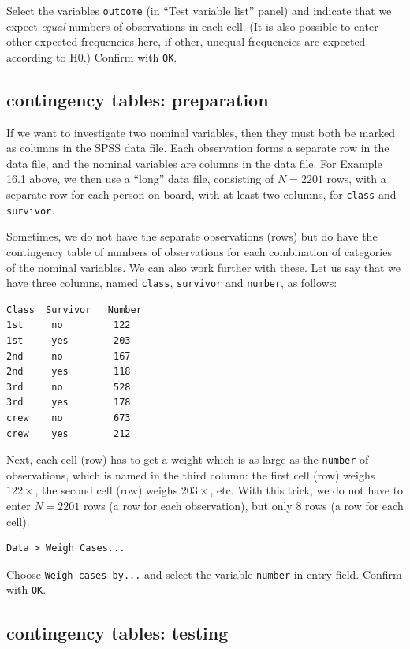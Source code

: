 \documentclass[
]{book}
\begin{document}
Select the variables \texttt{outcome} (in ``Test variable list'' panel) and
indicate that we expect \emph{equal} numbers of observations in each cell.
(It is also possible to enter other expected frequencies here,
if other, unequal frequencies are expected according to H0.)
Confirm with \texttt{OK}.

\subsection{contingency tables: preparation}\label{contingency-tables-preparation}

If we want to investigate two nominal variables, then they must
both be marked as columns in the SPSS data file. Each observation
forms a separate row in the data file, and the nominal variables
are columns in the data file. For Example 16.1 above, we then use a ``long''
data file, consisting of \(N=2201\) rows, with a separate row for each person
on board, with at least two columns, for \texttt{class} and
\texttt{survivor}.

Sometimes, we do not have the separate observations (rows) but
do have the contingency table of numbers of observations for each
combination of categories of the nominal variables. We can also
work further with these. Let us say that we have three columns, named
\texttt{class}, \texttt{survivor} and \texttt{number}, as follows:

\begin{verbatim}
Class  Survivor   Number
1st     no         122
1st     yes        203
2nd     no         167
2nd     yes        118
3rd     no         528
3rd     yes        178
crew    no         673
crew    yes        212
\end{verbatim}

Next, each cell (row) has to get a weight which is as large as
the \texttt{number} of observations, which is named in the third column: the
first cell (row) weighs \(122\times\), the second cell (row) weighs
\(203\times\), etc. With this trick, we do not have to enter \(N=2201\) rows
(a row for each observation), but only 8 rows (a row
for each cell).

\begin{verbatim}
Data > Weigh Cases... 
\end{verbatim}

Choose \texttt{Weigh\ cases\ by...} and select the variable \texttt{number} in
entry field. Confirm with \texttt{OK}.

\subsection{contingency tables: testing}\label{contingency-tables-testing}
\end{document}
